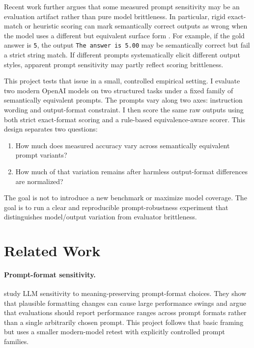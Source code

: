 \documentclass[11pt]{article}
\begin{document}
Recent work further argues that some measured prompt sensitivity may be an evaluation artifact rather than pure model brittleness. In particular, rigid exact-match or heuristic scoring can mark semantically correct outputs as wrong when the model uses a different but equivalent surface form \citep{hua2025flaw}. For example, if the gold answer is \texttt{5}, the output \texttt{The answer is 5.00} may be semantically correct but fail a strict string match. If different prompts systematically elicit different output styles, apparent prompt sensitivity may partly reflect scoring brittleness.

This project tests that issue in a small, controlled empirical setting. I evaluate two modern OpenAI models on two structured tasks under a fixed family of semantically equivalent prompts. The prompts vary along two axes: instruction wording and output-format constraint. I then score the same raw outputs using both strict exact-format scoring and a rule-based equivalence-aware scorer. This design separates two questions:

\begin{enumerate}[leftmargin=*]
    \item How much does measured accuracy vary across semantically equivalent prompt variants?
    \item How much of that variation remains after harmless output-format differences are normalized?
\end{enumerate}

The goal is not to introduce a new benchmark or maximize model coverage. The goal is to run a clear and reproducible prompt-robustness experiment that distinguishes model/output variation from evaluator brittleness.

\section{Related Work}

\paragraph{Prompt-format sensitivity.}
\citet{sclar2024sensitivity} study LLM sensitivity to meaning-preserving prompt-format choices. They show that plausible formatting changes can cause large performance swings and argue that evaluations should report performance ranges across prompt formats rather than a single arbitrarily chosen prompt. This project follows that basic framing but uses a smaller modern-model retest with explicitly controlled prompt families.
\end{document}
